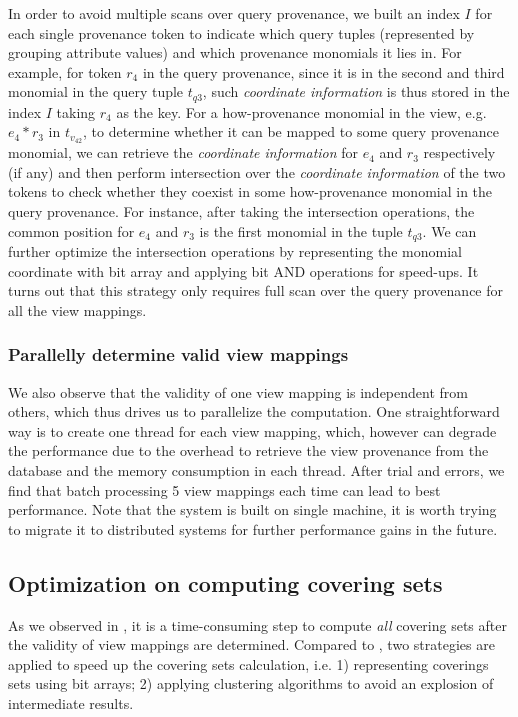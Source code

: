 \begin{example}
In order to avoid multiple scans over query provenance, we built an index $I$ for each single provenance token to indicate which query tuples (represented by grouping attribute values) and which provenance monomials it lies in. For example, for token $r_4$ in the query provenance, since it is in the second and third monomial in the query tuple $t_{q3}$, such {\em coordinate information} is thus stored in the index $I$ taking $r_4$ as the key. For a how-provenance monomial in the view, e.g. $e_4*r_3$ in $t_{v_42}$, to determine whether it can be mapped to some query provenance monomial, we can retrieve the {\em coordinate information} for $e_4$ and $r_3$ respectively (if any) and then perform intersection over the {\em coordinate information} of the two tokens to check whether they coexist in some how-provenance monomial in the query provenance. For instance, after taking the intersection operations, the common position for $e_4$ and $r_3$ is the first monomial in the tuple $t_{q3}$. We can further optimize the intersection operations by representing the monomial coordinate with bit array and applying bit AND operations for speed-ups. It turns out that this strategy only requires full scan over the query provenance for all the view mappings.

\subsubsection{Parallelly determine valid view mappings}
We also observe that the validity of one view mapping is independent from others, which thus drives us to parallelize the computation. One straightforward way is to create one thread for each view mapping, which, however can degrade the performance due to the overhead to retrieve the view provenance from the database and the memory consumption in each thread. After trial and errors, we find that batch processing 5 view mappings each time can lead to best performance. Note that the system is built on single machine, it is worth trying to migrate it to distributed systems for further performance gains in the future.



\subsection{Optimization on computing covering sets}
As we observed in \cite{wu2018data}, it is a time-consuming step to compute {\em all} covering sets after the validity of view mappings are determined. Compared to \cite{wu2018data}, two strategies are applied to speed up the covering sets calculation, i.e. 1) representing coverings sets using bit arrays; 2) applying clustering algorithms to avoid an explosion of intermediate results. 


\end{example}

